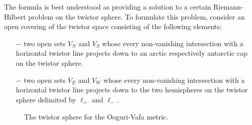 \documentclass[11pt]{amsart}
\theoremstyle{remark}
\theoremstyle{remark}
\theoremstyle{definition}
\theoremstyle{definition}
\theoremstyle{definition}
\newcommand{\0}{{\scriptstyle 0'}} %
\newcommand{\1}{{\scriptstyle 1'}}
\newcommand\pgfmathsinandcos[3]{%
  \pgfmathsetmacro#1{sin(#3)}%
  \pgfmathsetmacro#2{cos(#3)}%
}
\newcommand\LongitudePlane[3][current plane]{%
  \pgfmathsinandcos\sinEl\cosEl{#2} %
  \pgfmathsinandcos\sint\cost{#3} %
  \tikzset{#1/.style={cm={\cost,\sint*\sinEl,0,\cosEl,(0,0)}}}
}
\newcommand\LatitudePlane[3][current plane]{%
  \pgfmathsinandcos\sinEl\cosEl{#2} %
  \pgfmathsinandcos\sint\cost{#3} %
  \pgfmathsetmacro\yshift{\cosEl*\sint}
  \tikzset{#1/.style={cm={\cost,0,0,\cost*\sinEl,(0,\yshift)}}} %
}
\newcommand\DrawLongitudeCircle[2][1]{
  \LongitudePlane{\angEl}{#2}
  \tikzset{current plane/.prefix style={scale=#1}}
  \pgfmathsetmacro\angVis{atan(sin(#2)*cos(\angEl)/sin(\angEl))} %
  \draw[current plane] (\angVis:1) arc (\angVis:\angVis+180:1);
  \draw[current plane,dashed] (\angVis-180:1) arc (\angVis-180:\angVis:1);
}
\newcommand\DrawLatitudeCircle[2][2]{
  \LatitudePlane{\angEl}{#2}
  \tikzset{current plane/.prefix style={scale=#1}}
  \pgfmathsetmacro\sinVis{sin(#2)/cos(#2)*sin(\angEl)/cos(\angEl)}
  \pgfmathsetmacro\angVis{asin(min(1,max(\sinVis,-1)))}
  \draw[current plane] (\angVis:1) arc (\angVis:-\angVis-180:1);
  \draw[current plane,dashed] (180-\angVis:1) arc (180-\angVis:\angVis:1);
}
\begin{document}
The formula is best understood as providing a solution to a certain Rie\-mann-Hil\-bert problem on the twistor sphere. To formulate this problem, consider an open covering of the twistor space consisting of the following elements:
\begin{itemize}
\setlength{\itemsep}{0pt}

\item[$-$] two open sets $V_N$ and $V_S$ whose every non-vanishing intersection with a horizontal twistor line projects down to an arctic respectively antarctic cap on the twistor sphere.
\item[$-$] two open sets $V_E$ and $V_W$ whose every non-vanishing intersection with a horizontal twistor line projects down to the two hemispheres on the twistor sphere delimited by $\ell_+$ and $\ell_-$.
\end{itemize}

\begin{figure}[ht]


\caption{The twistor sphere for the Ooguri-Vafa metric.}
\end{figure}
\end{document}
